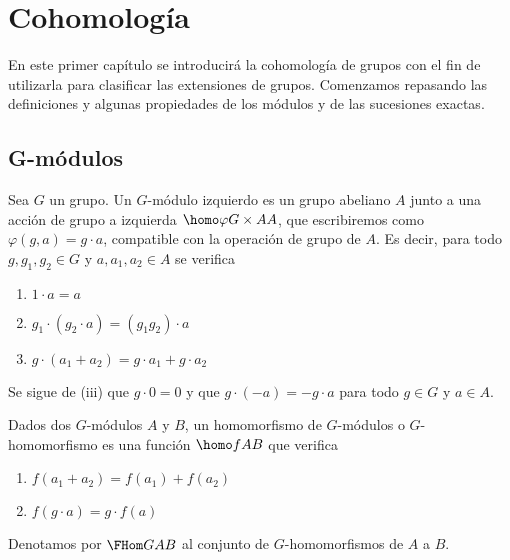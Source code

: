 
\chapter{Cohomología}

En este primer capítulo se introducirá la cohomología de grupos con el fin de utilizarla para clasificar las extensiones de grupos.
Comenzamos repasando las definiciones y algunas propiedades de los módulos y de las sucesiones exactas.

\section{G-módulos}

\begin{definicion}
	Sea $G$ un grupo. Un $G$-módulo izquierdo es un grupo abeliano $A$ junto a una acción de grupo a izquierda $\homo \varphi {G\times A} A$, que escribiremos como $\varphi(g,a)=g\cdot a$, compatible con la operación de grupo de $A$. Es decir, para todo $g,g_1,g_2\in G$ y $a,a_1,a_2\in A$ se verifica
	\begin{enumerate}
		\item $1\cdot a=a$
		\item $g_1\cdot(g_2\cdot a)=(g_1g_2)\cdot a$
		\item $g\cdot (a_1+a_2)=g\cdot a_1+g\cdot a_2$
	\end{enumerate} 
	
	Se sigue de (iii) que $g\cdot 0 = 0$ y que $g\cdot (-a) = - g\cdot a$ para todo $g\in G$ y $a\in A$.
\end{definicion}

\begin{definicion}
	Dados dos $G$-módulos $A$ y $B$, un homomorfismo de $G$-módulos o $G$-homomorfismo es una función $\homo f A B$ que verifica
	\begin{enumerate}
		\item $f(a_1+a_2) = f(a_1)+f(a_2)$
		\item $f(g\cdot a) = g\cdot f(a)$
	\end{enumerate}
	
	Denotamos por $\FHom G A B$ al conjunto de $G$-homomorfismos de $A$ a $B$.
\end{definicion}


